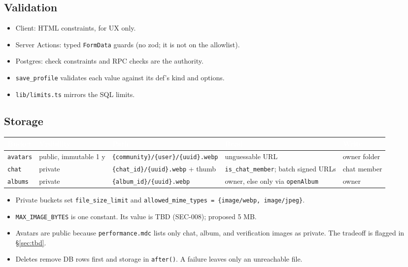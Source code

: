 \documentclass[11pt,a4paper]{article}
\newcommand{\hdr}[1]{\textcolor{white}{\textbf{#1}}}
\newcommand{\code}[1]{\texttt{\small #1}}
\begin{document}
\subsection{Validation}
\begin{itemize}
  \item Client: HTML constraints, for UX only.
  \item Server Actions: typed \code{FormData} guards (no zod; it is not on the allowlist).
  \item Postgres: check constraints and RPC checks are the authority.
  \item \code{save\_profile} validates each value against its def's kind and options.
  \item \code{lib/limits.ts} mirrors the SQL limits.
\end{itemize}

\subsection{Storage}
{\small
{}
\begin{longtable}{L{1.6cm} L{3.2cm} L{3.8cm} L{3.8cm} L{2.4cm}}
\hdr{Bucket} & \hdr{Visibility} & \hdr{Path} & \hdr{Read} & \hdr{Write}\\
\endhead
\code{avatars} & public, immutable 1 y & \code{\{community\}/\{user\}/\{uuid\}.webp} & unguessable URL & owner folder\\
\code{chat} & private & \code{\{chat\_id\}/\{uuid\}.webp} + thumb & \code{is\_chat\_member}; batch signed URLs & chat member\\
\code{albums} & private & \code{\{album\_id\}/\{uuid\}.webp} & owner, else only via \code{openAlbum} & owner\\
\end{longtable}
}
\begin{itemize}
  \item Private buckets set \code{file\_size\_limit} and \code{allowed\_mime\_types = \{image/webp, image/jpeg\}}.
  \item \code{MAX\_IMAGE\_BYTES} is one constant. Its value is TBD (SEC-008); proposed 5 MB.
  \item Avatars are public because \code{performance.mdc} lists only chat, album, and verification images as
        private. The tradeoff is flagged in \S\ref{sec:tbd}.
  \item Deletes remove DB rows first and storage in \code{after()}. A failure leaves only an unreachable file.
\end{itemize}
\end{document}
